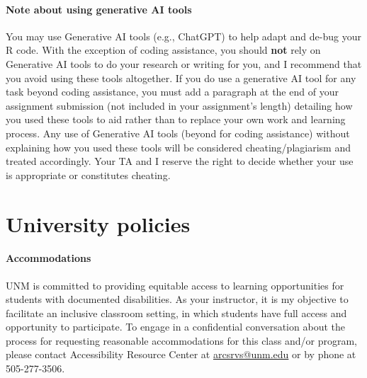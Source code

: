 \documentclass[11pt]{article}
\begin{document}
\paragraph{Note about using generative AI tools} You may use Generative AI tools (e.g., ChatGPT) to help adapt and de-bug your R code. With the exception of coding assistance, you should \textbf{not} rely on Generative AI tools to do your research or writing for you, and I recommend that you avoid using these tools altogether. If you do use a generative AI tool for any task beyond coding assistance, you must add a paragraph at the end of your assignment submission (not included in your assignment's length) detailing how you used these tools to aid rather than to replace your own work and learning process. Any use of Generative AI tools (beyond for coding assistance) without explaining how you used these tools will be considered cheating/plagiarism and treated accordingly. Your TA and I reserve the right to decide whether your use is appropriate or constitutes cheating.

\section*{University policies}
\paragraph{Accommodations} UNM is committed to providing equitable access to learning opportunities for students with documented disabilities. As your instructor, it is my objective to facilitate an inclusive classroom setting, in which students have full access and opportunity to participate. To engage in a confidential conversation about the process for requesting reasonable accommodations for this class and/or program, please contact Accessibility Resource Center at \href{arcsrvs@unm.edu}{arcsrvs@unm.edu} or by phone at 505-277-3506.

\vspace{-5pt}
\end{document}

